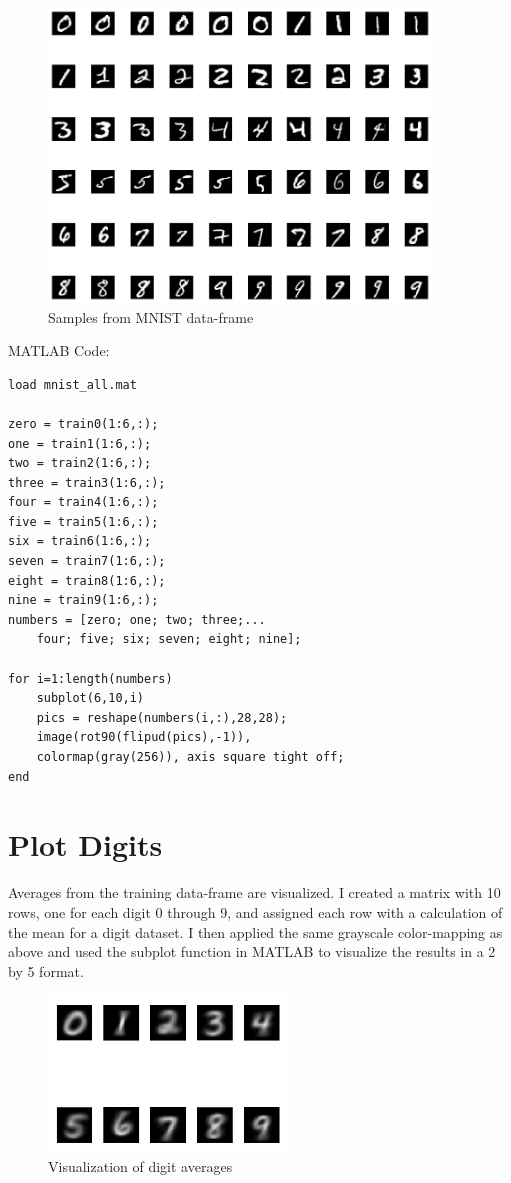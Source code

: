 \documentclass[letterpaper,11pt]{article}
\begin{document}
\begin{figure}[]
	\centering
	\includegraphics[width=4in]{fig3.png}
	\caption{Samples from MNIST data-frame}
	\label{fig:numbers}
\end{figure}

\vspace{5mm}
MATLAB Code:

\begin{verbatim}
load mnist_all.mat

zero = train0(1:6,:);
one = train1(1:6,:);
two = train2(1:6,:);
three = train3(1:6,:);
four = train4(1:6,:);
five = train5(1:6,:);
six = train6(1:6,:);
seven = train7(1:6,:);
eight = train8(1:6,:);
nine = train9(1:6,:);
numbers = [zero; one; two; three;...
    four; five; six; seven; eight; nine];

for i=1:length(numbers)
    subplot(6,10,i)
    pics = reshape(numbers(i,:),28,28);
    image(rot90(flipud(pics),-1)),
    colormap(gray(256)), axis square tight off;
end
\end{verbatim}



\section{Plot Digits}



Averages from the training data-frame are visualized. I created a matrix with 10 rows, one for each digit 0 through 9, and assigned each row with a calculation of the mean for a digit dataset. I then applied the same grayscale color-mapping as above and used the subplot function in MATLAB to visualize the results in a 2 by 5 format.

\begin{figure}[]
	\centering
	\includegraphics[width=2.5in]{fig2.png}
	\caption{Visualization of digit averages}
	\label{fig:averages}
\end{figure}
\end{document}
